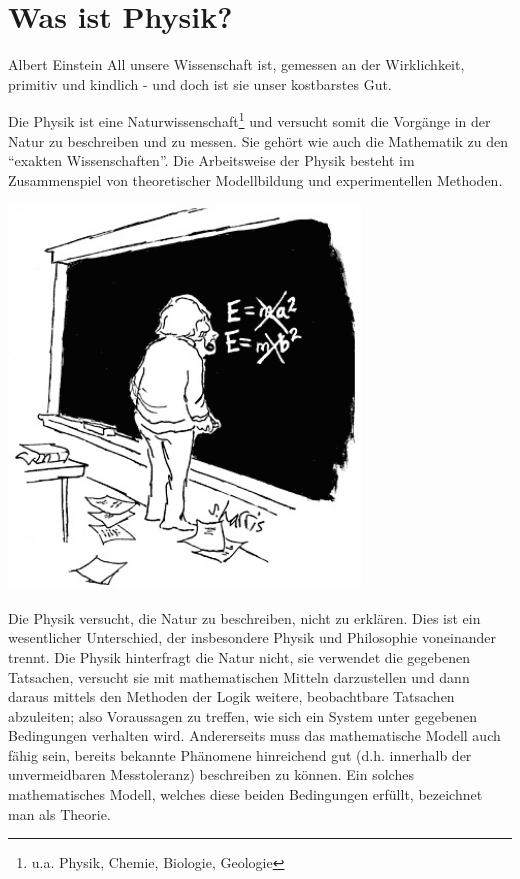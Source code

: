 
\chapter{Was ist Physik?}
\label{ch:wasistphysik}

\begin{aquote}{Albert Einstein}
    All unsere Wissenschaft ist, gemessen an der Wirklichkeit, primitiv und kindlich - und doch ist sie unser kostbarstes Gut. 
\end{aquote}

Die Physik ist eine Naturwissenschaft\footnote{u.a. Physik, Chemie, Biologie, Geologie} und versucht somit die Vorgänge in der Natur zu beschreiben und zu messen. Sie gehört wie auch die Mathematik zu den ``exakten Wissenschaften''. Die Arbeitsweise der Physik besteht im Zusammenspiel von theoretischer Modellbildung und experimentellen Methoden.
\begin{marginfigure}
	\includegraphics[width=0.7\textwidth]{Bilder/einstein.jpg}
	\label{fig:einsteinfig}
\end{marginfigure} 

Die Physik versucht, die Natur zu beschreiben, nicht zu erklären. Dies ist ein wesentlicher Unterschied, der insbesondere Physik und Philosophie voneinander trennt. Die Physik hinterfragt die Natur nicht, sie verwendet die gegebenen Tatsachen, versucht sie mit mathematischen Mitteln darzustellen und dann daraus mittels den Methoden der Logik weitere, beobachtbare Tatsachen abzuleiten; also Voraussagen zu treffen, wie sich ein System unter gegebenen Bedingungen verhalten wird. Andererseits muss das mathematische Modell auch fähig sein, bereits bekannte
Phänomene hinreichend gut (d.h. innerhalb der unvermeidbaren Messtoleranz) beschreiben zu
können. Ein solches mathematisches Modell, welches diese beiden Bedingungen erfüllt, bezeichnet
man als Theorie.


